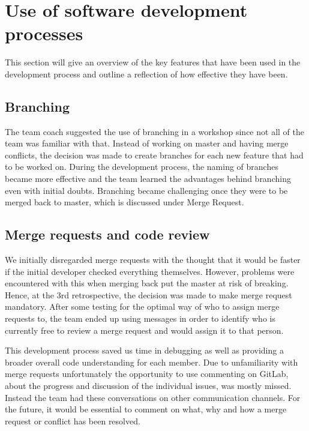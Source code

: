 \documentclass{l3proj}
\begin{document}

\section{Use of software development processes}
This section will give an overview of the key features that have been used in the development process and outline a reflection of how effective they have been.

\subsection{Branching}
The team coach suggested the use of branching in a workshop since not all of the team was familiar with that. Instead of working on master and having merge conflicts,  the decision was made to create branches for each new feature that had to be worked on. During the development process, the naming of branches became more effective and the team learned the advantages behind branching even with initial doubts. Branching became challenging once they were to be merged back to master, which is discussed under Merge Request.

\subsection{Merge requests and code review}
We initially disregarded merge requests with the thought that it would be faster if the initial developer checked everything themselves. However, problems were encountered with this when merging back put the master at risk of breaking. Hence, at the 3rd retrospective, the decision was made to make merge request mandatory. After some testing for the optimal way of who to assign merge requests to, the team ended up using messages in order to identify who is currently free to review a merge request and would assign it to that person.

This development process saved us time in debugging as well as providing a broader overall code understanding for each member.  Due to unfamiliarity with merge requests unfortunately the opportunity to use commenting on GitLab, about the progress and discussion of the individual issues, was mostly missed. Instead the team had these conversations on other communication channels. For the future, it would be essential to comment on what, why and how a merge request or conflict has been resolved. 
\end{document}
